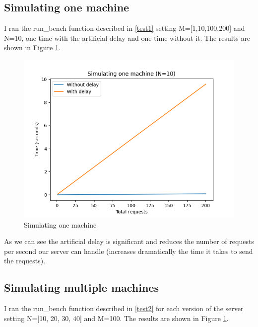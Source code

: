 \documentclass[a4paper, 11pt]{article}
\begin{document}
\subsection{Simulating one machine}
I ran the  run\_bench function described in \ref{test1} setting M=[1,10,100,200] and N=10, one time with the artificial delay and one time without  it. The results are shown in Figure \ref{fig:results1}.

\begin{figure}
  \begin{center}
    \includegraphics[scale=0.4]{result1.png}
    \caption{Simulating one machine}
    \label{fig:results1}
  \end{center}
\end{figure}

As we can see the artificial delay is significant and reduces the number of requests per second our server can handle (increases dramatically the time it takes to send the requests).  

\subsection{Simulating multiple machines}
I ran the  run\_bench function described in \ref{test2} for each version of the server setting N=[10, 20, 30, 40] and M=100. The results are shown in Figure \ref{fig:results1}.
\end{document}
